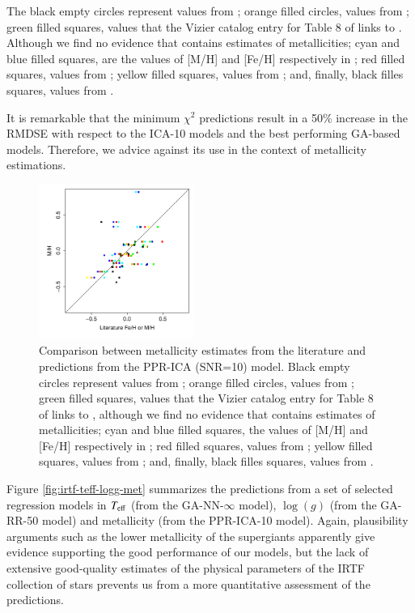 The black empty circles represent values
from \cite{cesetti} ; orange filled circles, values
from \cite{NevesIII}; green filled squares, values that the Vizier
catalog entry for Table 8 of
\cite{NevesIII} links to \cite{Jao}. Although we find no evidence
that \cite{Jao} contains estimates of metallicities; cyan and blue
filled squares, are the values of [M/H] and [Fe/H] respectively
in \cite{RA2012}; red filled squares, values from \cite{Mann2015};
yellow filled squares, values from \cite{Newton2014}; and, finally,
black filles squares, values from \cite{Gaidos2015}.

It is remarkable that the minimum $\chi^2$ predictions result in a
50\% increase in the RMDSE with respect to the ICA-10 models and the
best performing GA-based models. Therefore, we advice against its use
in the context of metallicity estimations. 

 \begin{figure}
 \centering
 \includegraphics[width=0.45\textwidth]{figs/irtf-figs/M-ICA10.pdf}

\caption{Comparison
  between metallicity estimates from the literature and predictions
  from the PPR-ICA (SNR=10) model.  Black empty circles represent
  values from \cite{cesetti} ; orange filled circles, values
  from \cite{NevesIII}; green filled squares, values that the Vizier
  catalog entry for Table 8 of \cite{NevesIII} links to \cite{Jao},
  although we find no evidence that \cite{Jao} contains estimates of
  metallicities; cyan and blue filled squares, the values of [M/H] and
  [Fe/H] respectively in \cite{RA2012}; red filled squares, values
  from \cite{Mann2015}; yellow filled squares, values
  from \cite{Newton2014}; and, finally, black filles squares, values
  from \cite{Gaidos2015}.}

\label{MIRTF_ICA_10}
\end {figure}

Figure \ref{fig:irtf-teff-logg-met} summarizes the predictions from a
set of selected regression models in $T_{\rm eff}$ (from the
GA-NN-$\infty$ model), $\log(g)$ (from the GA-RR-50 model) and
metallicity (from the PPR-ICA-10 model). Again, plausibility arguments
such as the lower metallicity of the supergiants apparently give
evidence supporting the good performance of our models, but the lack
of extensive good-quality estimates of the physical parameters of the
IRTF collection of stars prevents us from a more quantitative
assessment of the predictions.

